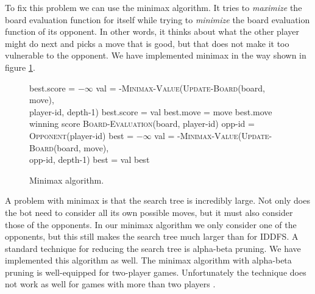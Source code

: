 To fix this problem we can use the minimax algorithm. It tries to
\emph{maximize} the board evaluation function for itself while trying
to \emph{minimize} the board evaluation function of its opponent. In
other words, it thinks about what the other player might do next and
picks a move that is good, but that does not make it too vulnerable to
the opponent. We have implemented minimax in the way shown in figure
\ref{minimax}.

\begin{figure}
\begin{algorithmic}
  \State best.score = $-\infty$
    \State val = -\textsc{Minimax-Value}(\textsc{Update-Board}(board, move), \\
    \hspace{160pt} player-id, depth-1)
      \State best.score = val
      \State best.move = move
    \EndIf
  \EndFor
  \State \Return best.move
\EndFunction
\\
  \State \Return winning score
  \State \Return \textsc{Board-Evaluation}(board, player-id)
\Else
  \State opp-id = \textsc{Opponent}(player-id)
  \State best = $-\infty$
    \State val = -\textsc{Minimax-Value}(\textsc{Update-Board}(board, move), \\
    \hspace{180pt} opp-id, depth-1)
      \State best = val
    \EndIf
  \EndFor
  \State \Return best
\EndIf
\EndFunction
\end{algorithmic}
\caption{Minimax algorithm.}
\label{minimax}
\end{figure}

A problem with minimax is that the search tree is incredibly large.
Not only does the bot need to consider all its own possible moves, but
it must also consider those of the opponents. In our minimax algorithm
we only consider one of the opponents, but this still makes the search
tree much larger than for IDDFS. A standard technique for reducing the
search tree is alpha-beta pruning. We have implemented this algorithm
as well. The minimax algorithm with alpha-beta pruning is
well-equipped for two-player games. Unfortunately the technique does
not work as well for games with more than two players
\cite{Korf199199}.

